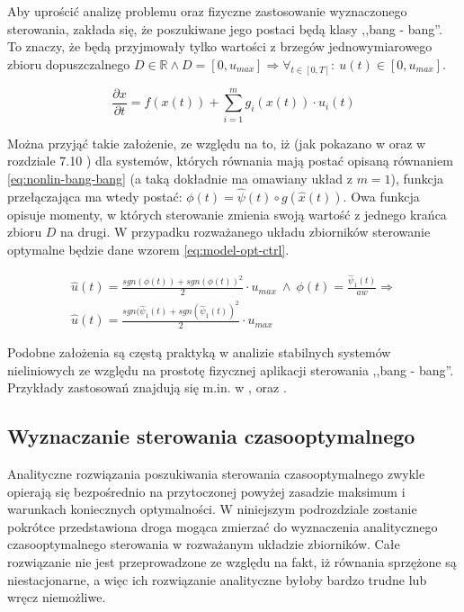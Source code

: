 Aby uprościć analizę problemu oraz fizyczne zastosowanie wyznaczonego sterowania, zakłada się, że poszukiwane jego postaci będą klasy ,,bang - bang''. To znaczy, że będą przyjmowały tylko wartości z brzegów jednowymiarowego zbioru dopuszczalnego $D \in \mathbb{R} \land D = [0, u_{max}] \Rightarrow \forall_{t \in [0, T]}:~ u(t) \in [0, u_{max}]$.

\begin{equation}\label{eq:nonlin-bang-bang}
    \frac{\partial x}{\partial t} = f(x(t)) + \sum_{i=1}^{m} g_{i}(x(t)) \cdot u_{i}(t)
\end{equation}

Można przyjąć takie założenie, ze względu na to, iż (jak pokazano w \cite{YiMa2008} oraz w rozdziale 7.10 \cite{AthansOptCtrl}) dla systemów, których równania mają postać opisaną równaniem \ref{eq:nonlin-bang-bang} (a taką dokładnie ma omawiany układ z $m = 1$), funkcja przełączająca ma wtedy postać: $\phi(t) = \hat{\psi}(t) \circ g(\hat{x}(t))$. Owa funkcja opisuje momenty, w których sterowanie zmienia swoją wartość z jednego krańca zbioru $D$ na drugi. W przypadku rozważanego układu zbiorników sterowanie optymalne będzie dane wzorem \ref{eq:model-opt-ctrl}.

\begin{equation}\label{eq:model-opt-ctrl}
\begin{array}{lr}
    \hat{u}(t) = \frac{sgn(\phi(t)) + sgn(\phi(t))^{2}}{2} \cdot u_{max} ~ \land ~ \phi(t) = \frac{\hat{\psi}_{1}(t)}{aw} \Rightarrow \\
    \hat{u}(t) = \frac{sgn(\hat{\psi}_{1}(t) + sgn(\hat{\psi}_{1}(t))^{2}}{2} \cdot u_{max}
\end{array}
\end{equation}

Podobne założenia są częstą praktyką w analizie stabilnych systemów nieliniowych ze względu na prostotę fizycznej aplikacji sterowania ,,bang - bang''. Przykłady zastosowań znajdują się m.in. w \cite{VakKek82}, \cite{BalSom83} oraz \cite{Itik2016}.

\subsection{Wyznaczanie sterowania czasooptymalnego}
\label{sub:toc-ctrl}

Analityczne rozwiązania poszukiwania sterowania czasooptymalnego zwykle opierają się bezpośrednio na przytoczonej powyżej zasadzie maksimum i warunkach koniecznych optymalności. W niniejszym podrozdziale zostanie pokrótce przedstawiona droga mogąca zmierzać do wyznaczenia analitycznego czasooptymalnego sterowania w rozważanym układzie zbiorników. Całe rozwiązanie nie jest przeprowadzone ze względu na fakt, iż równania sprzężone są niestacjonarne, a więc ich rozwiązanie analityczne byłoby bardzo trudne lub wręcz niemożliwe.

